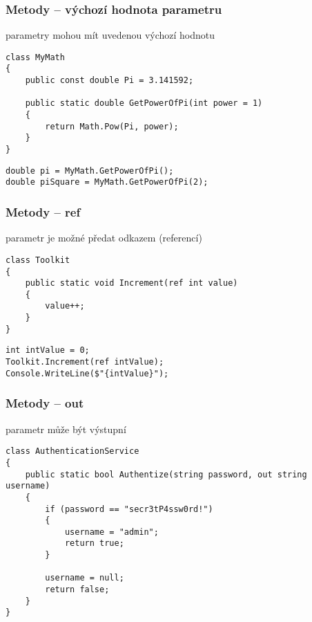 \begin{frame}[fragile]
\frametitle{Metody -- výchozí hodnota parametru}
\begin{bitemize}{}
\item parametry mohou mít uvedenou výchozí hodnotu
\end{bitemize}
\vfill
\begin{yesblock}
\begin{lstlisting}[basicstyle=\small]
class MyMath
{
    public const double Pi = 3.141592;

    public static double GetPowerOfPi(int power = 1)
    {
        return Math.Pow(Pi, power);
    }
}
\end{lstlisting}
\end{yesblock}
\vfill
\begin{yesblock}
\begin{lstlisting}[basicstyle=\small]
double pi = MyMath.GetPowerOfPi();
double piSquare = MyMath.GetPowerOfPi(2);
\end{lstlisting}
\end{yesblock}
\end{frame}




\begin{frame}[fragile]
\frametitle{Metody -- ref}
\begin{bitemize}{}
\item parametr je možné předat odkazem (referencí)
\end{bitemize}
\vfill
\begin{yesblock}
\begin{lstlisting}[basicstyle=\small]
class Toolkit
{
    public static void Increment(ref int value)
    {
        value++;
    }
}
\end{lstlisting}
\end{yesblock}
\vfill
\begin{yesblock}
\begin{lstlisting}[basicstyle=\small]
int intValue = 0;
Toolkit.Increment(ref intValue);
Console.WriteLine($"{intValue}");
\end{lstlisting}
\end{yesblock}
\end{frame}



\begin{frame}[fragile]
\frametitle{Metody -- out}
\begin{bitemize}{}
\item parametr může být výstupní
\end{bitemize}
\vfill
\begin{yesblock}
\begin{lstlisting}[basicstyle=\small]
class AuthenticationService
{
    public static bool Authentize(string password, out string username)
    {
        if (password == "secr3tP4ssw0rd!")
        {
            username = "admin";
            return true;
        }

        username = null;
        return false;
    }
}
\end{lstlisting}
\end{yesblock}
\end{frame}

